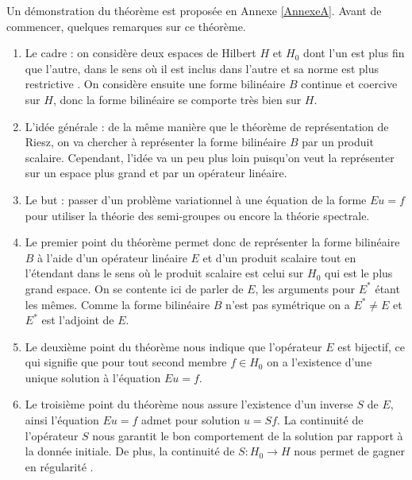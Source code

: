Un démonstration du théorème est proposée en Annexe \ref{AnnexeA}. Avant de commencer, quelques remarques sur ce théorème.

\begin{remark}
    \begin{enumerate}
        \item Le cadre : on considère deux espaces de Hilbert $H$ et $H_0$ dont l'un est \og plus fin \fg{} que l'autre, dans le sens où il est inclus dans l'autre et sa norme est \og plus restrictive \fg{}. On considère ensuite une forme bilinéaire $B$ continue et coercive sur $H$, donc la forme bilinéaire se comporte très bien sur $H$.
        \item L'idée générale : de la même manière que le théorème de représentation de Riesz, on va chercher à \og représenter \fg{} la forme bilinéaire $B$ par un produit scalaire. Cependant, l'idée va un peu plus loin puisqu'on veut la représenter sur un espace \og plus grand \fg{} et par un opérateur linéaire.
        \item Le but : passer d'un problème variationnel à une équation de la forme $Eu = f$ pour utiliser la théorie des semi-groupes ou encore la théorie spectrale.
        \item Le premier point du théorème permet donc de \og représenter \fg{} la forme bilinéaire $B$ à l'aide d'un opérateur linéaire $E$ et d'un produit scalaire tout en \og l'étendant \fg{} dans le sens où le produit scalaire est celui sur $H_0$ qui est le \og plus grand \fg{} espace. On se contente ici de parler de $E$, les arguments pour $E^*$ étant les mêmes. Comme la forme bilinéaire $B$ n'est pas symétrique on a $E^* \neq E$ et $E^*$ est l'adjoint de $E$.
        \item Le deuxième point du théorème nous indique que l'opérateur $E$ est bijectif, ce qui signifie que pour tout second membre $f \in H_0$ on a l'existence d'une unique solution à l'équation $Eu=f$.
        \item Le troisième point du théorème nous assure l'existence d'un inverse $S$ de $E$, ainsi l'équation $Eu=f$ admet pour solution $u=Sf$. La continuité de l'opérateur $S$ nous garantit le bon comportement de la solution par rapport à la donnée initiale. De plus, la continuité de $S : H_0 \rightarrow H$ nous permet de gagner en \og régularité \fg{}.
    \end{enumerate} 
\end{remark}

